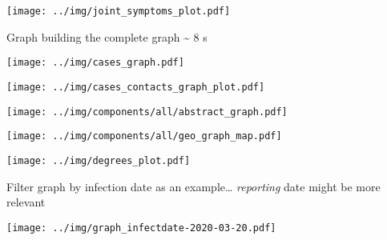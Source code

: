 \documentclass[
  8pt,
  ignorenonframetext,
]{beamer}
\begin{document}
\begin{frame}
\begin{center}
\texttt{[image: ../img/joint\_symptoms\_plot.pdf]}
\end{center}
\end{frame}

\begin{frame}{Graph}
\protect\hypertarget{graph}{}
building the complete graph \textasciitilde{} 8 s

\begin{center}
\texttt{[image: ../img/cases\_graph.pdf]}
\end{center}
\end{frame}

\begin{frame}
\begin{center}
\texttt{[image: ../img/cases\_contacts\_graph\_plot.pdf]}
\end{center}
\end{frame}

\begin{frame}
\begin{center}
\texttt{[image: ../img/components/all/abstract\_graph.pdf]}
\end{center}
\end{frame}

\begin{frame}
\begin{center}
\texttt{[image: ../img/components/all/geo\_graph\_map.pdf]}
\end{center}
\end{frame}

\begin{frame}
\begin{center}
\texttt{[image: ../img/degrees\_plot.pdf]}
\end{center}
\end{frame}

\begin{frame}{Filter graph by infection date}
\protect\hypertarget{filter-graph-by-infection-date}{}
as an example\ldots{} \emph{reporting} date might be more relevant

\begin{center}
\texttt{[image: ../img/graph\_infectdate-2020-03-20.pdf]}
\end{center}
\end{frame}
\end{document}
